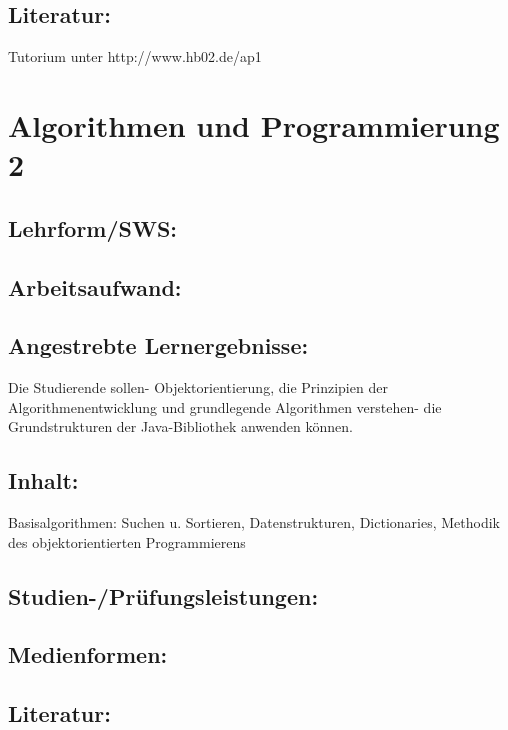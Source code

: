 \section{Literatur:}\label{literatur}

Tutorium unter http://www.hb02.de/ap1

\chapter{Algorithmen und Programmierung
2}\label{algorithmen-und-programmierung-2}

\section{Lehrform/SWS:}\label{lehrformsws-1}

\section{Arbeitsaufwand:}\label{arbeitsaufwand-1}

\section{Angestrebte
Lernergebnisse:}\label{angestrebte-lernergebnisse-1}

Die Studierende sollen- Objektorientierung, die Prinzipien der
Algorithmenentwicklung und grundlegende Algorithmen verstehen- die
Grundstrukturen der Java-Bibliothek anwenden können.

\section{Inhalt:}\label{inhalt-1}

Basisalgorithmen: Suchen u. Sortieren, Datenstrukturen, Dictionaries,
Methodik des objektorientierten Programmierens

\section{Studien-/Prüfungsleistungen:}\label{studien-pruxfcfungsleistungen-1}

\section{Medienformen:}\label{medienformen-1}

\section{Literatur:}\label{literatur-1}

